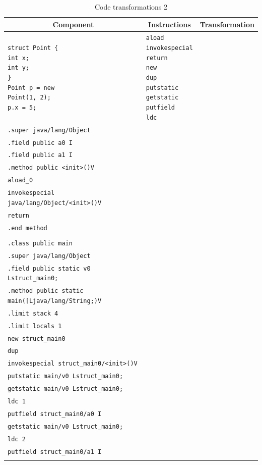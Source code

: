 \newpage

\begin{table}[bth]
	\footnotesize
	\centering
	\caption{Code transformations 2}
	\label{tab:trans2}
	\begin{tabular}{|l|l|l|}
		\hline
		\multicolumn{1}{|c|}{\textbf{Component}} & \multicolumn{1}{c|}{\textbf{Instructions}} & \multicolumn{1}{c|}{\textbf{Transformation}} \\ \hline
		\makecell[l]{\texttt{struct Point \{} \\ \quad\texttt{int x;} \\ \quad\texttt{int y;} \\ \texttt{\}} \\ \texttt{Point p = new} \\ \quad\texttt{Point(1, 2);} \\ \texttt{p.x = 5;}} & \makecell[l]{\texttt{aload} \\ \texttt{invokespecial} \\ \texttt{return} \\ \texttt{new} \\ \texttt{dup} \\ \texttt{putstatic} \\ \texttt{getstatic} \\ \texttt{putfield} \\ \texttt{ldc}} & \makecell[l]{\texttt{.class struct\_main0} \\ \texttt{.super java/lang/Object} \\ \texttt{.field public a0 I} \\ \texttt{.field public a1 I} \\ \texttt{.method public <init>()V} \\ \texttt{aload\_0} \\ \texttt{invokespecial java/lang/Object/<init>()V} \\ \texttt{return} \\ \texttt{.end method} \\ \texttt{} \\ \texttt{.class public main} \\ \texttt{.super java/lang/Object} \\ \texttt{.field public static v0 Lstruct\_main0;} \\ \texttt{.method public static main([Ljava/lang/String;)V} \\ \texttt{.limit stack 4} \\ \texttt{.limit locals 1} \\ \texttt{new struct\_main0} \\ \texttt{dup} \\ \texttt{invokespecial struct\_main0/<init>()V} \\ \texttt{putstatic main/v0 Lstruct\_main0;} \\ \texttt{getstatic main/v0 Lstruct\_main0;} \\ \texttt{ldc 1} \\ \texttt{putfield struct\_main0/a0 I} \\ \texttt{getstatic main/v0 Lstruct\_main0;} \\ \texttt{ldc 2} \\ \texttt{putfield struct\_main0/a1 I} \\ \texttt{getstatic 
\end{tabular}
\end{table}
